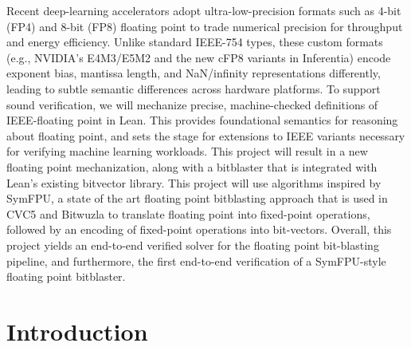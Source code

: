 \documentclass[onecolumn]{article}
\begin{document}
Recent deep-learning accelerators adopt ultra-low-precision formats such as
4-bit (FP4) and 8-bit (FP8) floating point to trade numerical precision for throughput and
energy efficiency. Unlike standard IEEE-754
types, these custom formats (e.g., NVIDIA’s E4M3/E5M2 and the new cFP8 variants in Inferentia)
encode exponent bias, mantissa length, and NaN/infinity representations
differently, leading to subtle semantic differences across hardware platforms.
To support sound verification, we will mechanize precise, machine-checked definitions of IEEE-floating point in Lean.
This provides foundational semantics for reasoning about floating point,
and sets the stage for extensions to IEEE variants necessary for verifying machine learning workloads.
This project will result in a new floating point mechanization, along with a bitblaster that is integrated with Lean's existing bitvector library.
This project will use algorithms inspired by SymFPU, a state of the art floating point bitblasting approach that is used in CVC5 and Bitwuzla
to translate floating point into fixed-point operations,
followed by an encoding of fixed-point operations into bit-vectors.
Overall, this project yields an end-to-end verified solver for the floating point bit-blasting pipeline,
and furthermore, the first end-to-end verification of a SymFPU-style floating point bitblaster.
\section{Introduction}

\end{document}

